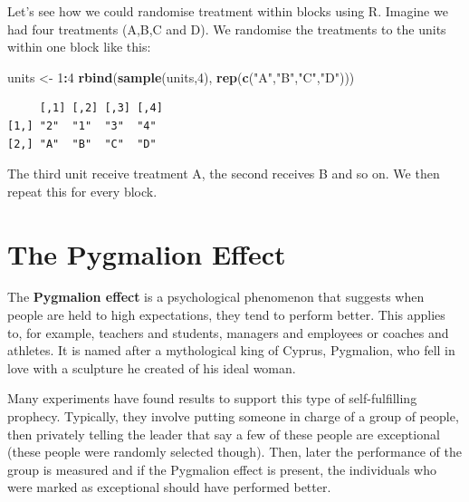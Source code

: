 \documentclass[
  letterpaper,
]{book}
\newenvironment{Shaded}{\begin{snugshade}}{\end{snugshade}}
\newcommand{\DecValTok}[1]{\textcolor[rgb]{0.00,0.00,0.81}{#1}}
\newcommand{\FunctionTok}[1]{\textcolor[rgb]{0.13,0.29,0.53}{\textbf{#1}}}
\newcommand{\NormalTok}[1]{#1}
\newcommand{\OtherTok}[1]{\textcolor[rgb]{0.56,0.35,0.01}{#1}}
\newcommand{\SpecialCharTok}[1]{\textcolor[rgb]{0.81,0.36,0.00}{\textbf{#1}}}
\newcommand{\StringTok}[1]{\textcolor[rgb]{0.31,0.60,0.02}{#1}}
\begin{document}
Let's see how we could randomise treatment within blocks using R.
Imagine we had four treatments (A,B,C and D). We randomise the
treatments to the units within one block like this:

\begin{Shaded}
\begin{Highlighting}[]
\NormalTok{units }\OtherTok{\textless{}{-}} \DecValTok{1}\SpecialCharTok{:}\DecValTok{4}
\FunctionTok{rbind}\NormalTok{(}\FunctionTok{sample}\NormalTok{(units,}\DecValTok{4}\NormalTok{), }\FunctionTok{rep}\NormalTok{(}\FunctionTok{c}\NormalTok{(}\StringTok{"A"}\NormalTok{,}\StringTok{"B"}\NormalTok{,}\StringTok{"C"}\NormalTok{,}\StringTok{"D"}\NormalTok{)))}
\end{Highlighting}
\end{Shaded}

\begin{verbatim}
     [,1] [,2] [,3] [,4]
[1,] "2"  "1"  "3"  "4" 
[2,] "A"  "B"  "C"  "D" 
\end{verbatim}

The third unit receive treatment A, the second receives B and so on. We
then repeat this for every block.

\section{The Pygmalion Effect}\label{the-pygmalion-effect}

The \textbf{Pygmalion effect} is a psychological phenomenon that
suggests when people are held to high expectations, they tend to perform
better. This applies to, for example, teachers and students, managers
and employees or coaches and athletes. It is named after a mythological
king of Cyprus, Pygmalion, who fell in love with a sculpture he created
of his ideal woman.


Many experiments have found results to support this type of
self-fulfilling prophecy. Typically, they involve putting someone in
charge of a group of people, then privately telling the leader that say
a few of these people are exceptional (these people were randomly
selected though). Then, later the performance of the group is measured
and if the Pygmalion effect is present, the individuals who were marked
as exceptional should have performed better.
\end{document}
